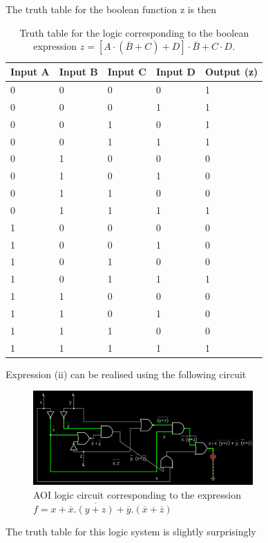 \documentclass{article}
\newcommand{\ol}[1]{\overline{#1}}
\begin{document}
	The truth table for the boolean function z is then
		\begin{table}[H]
		\centering
		\begin{tabular}{|l|l|l|l|l|}
			\hline
			Input A & Input B & Input C & Input D & Output (z)\\
			\hline
			0 & 0 & 0 & 0 & 1\\
			0 & 0 & 0 & 1 & 1\\
			0 & 0 & 1 & 0 & 1 \\
			0 & 0 & 1 & 1 & 1 \\
			\hline
			0 & 1 & 0 & 0 & 0 \\
			0 & 1 & 0 & 1 & 0\\
			0 & 1 & 1 & 0 & 0\\
			0 & 1 & 1 & 1 & 1\\
			\hline
			1 & 0 & 0 & 0 & 0\\
			1 & 0 & 0 & 1 & 0\\
			1 & 0 & 1 & 0 & 0\\
			1 & 0 & 1 & 1 & 1\\
			\hline
			1 & 1 & 0 & 0 & 0\\
			1 & 1 & 0 & 1 & 0\\
			1 & 1 & 1 & 0 & 0\\
			1 & 1 & 1 & 1 & 1\\
			\hline
		\end{tabular}
		\caption{Truth table for the logic corresponding to the boolean expression $z = [A\cdot (\ol{B} + C) + D]\cdot \bar{B} + C \cdot D$.}
	\end{table}
Expression (ii) can be realised using the following circuit
	\begin{figure}[H]
		\centering
		\includegraphics[width=0.75\textwidth]{two}
		\caption{AOI logic circuit corresponding to the expression $ f = x + \ol{x}.\ol{(y+z)} +\ol{y}.(\ol{x} + \ol{z})$ }
		\label{circuit2}
	\end{figure}
	
	The truth table for this logic system is slightly surprisingly 
	
\end{document}
